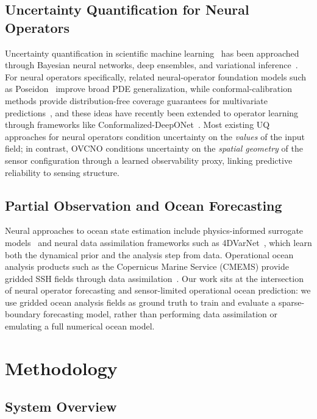 \documentclass[11pt,a4paper]{article}
\begin{document}
\subsection{Uncertainty Quantification for Neural Operators}

Uncertainty quantification in scientific machine learning~\cite{psaros2023uncertainty} has been approached through Bayesian neural networks, deep ensembles, and variational inference~\cite{kingma2013vae}. For neural operators specifically, related neural-operator foundation models such as Poseidon~\cite{herde2024poseidon} improve broad PDE generalization, while conformal-calibration methods provide distribution-free coverage guarantees for multivariate predictions~\cite{feldman2023conformal}, and these ideas have recently been extended to operator learning through frameworks like Conformalized-DeepONet~\cite{moya2024conformal}. Most existing UQ approaches for neural operators condition uncertainty on the \emph{values} of the input field; in contrast, OVCNO conditions uncertainty on the \emph{spatial geometry} of the sensor configuration through a learned observability proxy, linking predictive reliability to sensing structure.

\subsection{Partial Observation and Ocean Forecasting}

Neural approaches to ocean state estimation include physics-informed surrogate models~\cite{xu2024coastal, liu2026physics} and neural data assimilation frameworks such as 4DVarNet~\cite{fablet2021learning}, which learn both the dynamical prior and the analysis step from data. Operational ocean analysis products such as the Copernicus Marine Service (CMEMS) provide gridded SSH fields through data assimilation~\cite{lellouche2018cmems}. Our work sits at the intersection of neural operator forecasting and sensor-limited operational ocean prediction: we use gridded ocean analysis fields as ground truth to train and evaluate a sparse-boundary forecasting model, rather than performing data assimilation or emulating a full numerical ocean model.

\section{Methodology}

\subsection{System Overview}
\end{document}

